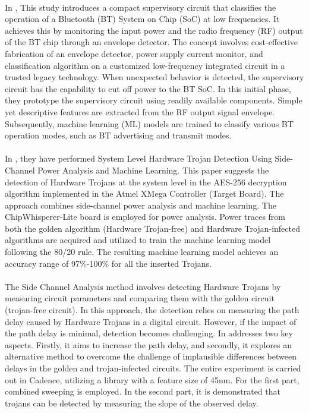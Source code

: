 \paragraph*{}
In \cite{8885273}, This study introduces a compact supervisory circuit that classifies the operation of a Bluetooth (BT) System on Chip (SoC) at low frequencies. It achieves this by monitoring the input power and the radio frequency (RF) output of the BT chip through an envelope detector. The concept involves cost-effective fabrication of an envelope detector, power supply current monitor, and classification algorithm on a customized low-frequency integrated circuit in a trusted legacy technology. When unexpected behavior is detected, the supervisory circuit has the capability to cut off power to the BT SoC. In this initial phase, they prototype the supervisory circuit using readily available components. Simple yet descriptive features are extracted from the RF output signal envelope. Subsequently, machine learning (ML) models are trained to classify various BT operation modes, such as BT advertising and transmit modes.
\paragraph*{}
In \cite{9137882}, they have performed System Level Hardware Trojan Detection Using Side-Channel Power Analysis and Machine Learning. This paper suggests the detection of Hardware Trojans at the system level in the AES-256 decryption algorithm implemented in the Atmel XMega Controller (Target Board). The approach combines side-channel power analysis and machine learning. The ChipWhisperer-Lite board is employed for power analysis. Power traces from both the golden algorithm (Hardware Trojan-free) and Hardware Trojan-infected algorithms are acquired and utilized to train the machine learning model following the 80/20 rule. The resulting machine learning model achieves an accuracy range of 97\%-100\% for all the inserted Trojans.
\paragraph*{}
The Side Channel Analysis method involves detecting Hardware Trojans by measuring circuit parameters and comparing them with the golden circuit (trojan-free circuit). In this approach, the detection relies on measuring the path delay caused by Hardware Trojans in a digital circuit. However, if the impact of the path delay is minimal, detection becomes challenging. In \cite{9393058} addresses two key aspects. Firstly, it aims to increase the path delay, and secondly, it explores an alternative method to overcome the challenge of implausible differences between delays in the golden and trojan-infected circuits. The entire experiment is carried out in Cadence, utilizing a library with a feature size of 45nm. For the first part, combined sweeping is employed. In the second part, it is demonstrated that trojans can be detected by measuring the slope of the observed delay. 
